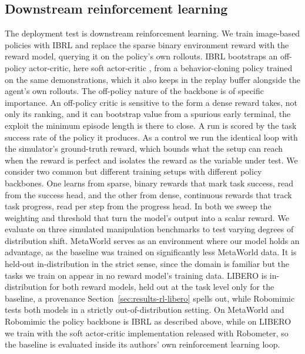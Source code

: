 \subsection{Downstream reinforcement learning}

The deployment test is downstream reinforcement learning. We train image-based policies with IBRL \citep{hu_imitation_2024}
and replace the sparse binary environment reward with the reward model, querying it on the policy's own rollouts. IBRL bootstraps an off-policy actor-critic, here soft actor-critic \citep{haarnoja_soft_2018}, from a behavior-cloning policy trained on the same demonstrations, which it also keeps in the replay buffer alongside the agent's own rollouts. The off-policy nature of the backbone is of specific importance. An off-policy critic is sensitive to the form a dense reward takes, not only its ranking, and it can bootstrap value from a spurious early terminal, the exploit the minimum episode length is there to close. A run is scored by the task success rate of the policy it produces. As a control we run the identical loop with the simulator's ground-truth reward, which bounds what the setup can reach when the reward is perfect and isolates the reward as the variable under test. We consider two common but different training setups with different policy backbones. One learns from sparse, binary rewards that mark task success, read from the success head, and the other from dense, continuous rewards that track task progress, read per step from the progress head. In both we sweep the weighting and threshold that turn the model's output into a scalar reward. We evaluate on three simulated manipulation benchmarks to test varying degrees of distribution shift. MetaWorld \citep{yu_meta-world_2019, mclean_meta-world_2025} serves as an environment where our model holds an advantage, as the baseline was trained on significantly less MetaWorld data. It is held-out in-distribution in the strict sense, since the domain is familiar but the tasks we train on appear in no reward model's training data. LIBERO \citep{liu_libero_2023} is in-distribution for both reward models, held out at the task level only for the baseline, a provenance Section~\ref{sec:results-rl-libero} spells out, while Robomimic \citep{robomimic} tests both models in a strictly out-of-distribution setting. On MetaWorld and Robomimic the policy backbone is IBRL as described above, while on LIBERO we train with the soft actor-critic implementation released with Robometer, so the baseline is evaluated inside its authors' own reinforcement learning loop.

